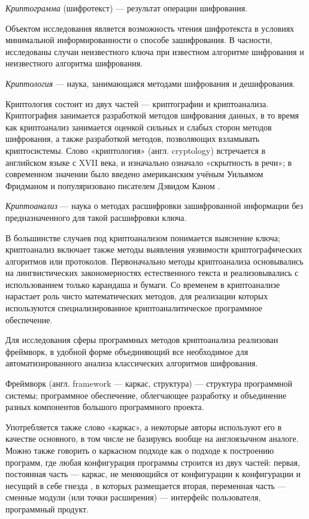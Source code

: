 \DEF\textit{Криптограмма} (шифротекст) --- результат операции шифрования.

Объектом исследования является возможность чтения шифротекста
в условиях минимальной информированности о способе 
зашифрования. В часности, исследованы случаи неизвестного 
ключа при известном алгоритме шифрования и неизвестного 
алгоритма шифрования.

\DEF\textit{Криптология} --- наука, занимающаяся методами шифрования и 
дешифрования. 

Криптология состоит из двух частей --- криптографии и криптоанализа. 
Криптография 
занимается разработкой методов шифрования данных, в то время как 
криптоанализ занимается оценкой сильных и слабых сторон методов 
шифрования, а также разработкой методов, позволяющих взламывать 
криптосистемы. Слово «криптология» (англ. cryptology) встречается в 
английском языке с XVII века, и изначально означало «скрытность в речи»; 
в современном значении было введено американским учёным Уильямом Фридманом 
и популяризовано писателем Дэвидом Каном \cite{khan-codebreakers}.

\DEF\textit{Криптоанализ} --- 
наука о методах расшифровки зашифрованной информации без предназначенного 
для такой расшифровки ключа.

В большинстве случаев под криптоанализом понимается выяснение ключа; 
криптоанализ включает также методы выявления уязвимости криптографических 
алгоритмов или протоколов. Первоначально методы криптоанализа основывались 
на лингвистических закономерностях естественного текста и реализовывались 
с использованием только карандаша и бумаги. Со временем в криптоанализе 
нарастает роль чисто математических методов, для реализации которых 
используются специализированное криптоаналитическое программное 
обеспечение.

Для исследования сферы программных методов криптоанализа 
реализован фреймворк, в удобной форме объединяющий все 
необходимое для автоматизированного анализа классических 
алгоритмов шифрования.

Фреймворк (англ. framework — каркас, структура) — структура программной 
системы; программное обеспечение, облегчающее разработку и объединение 
разных компонентов большого программного проекта. 

Употребляется 
также слово «каркас», а некоторые авторы используют его в качестве 
основного, в том числе не базируясь вообще на англоязычном аналоге.
Можно также говорить о каркасном подходе как о 
подходе к построению программ, где любая конфигурация программы 
строится из двух частей: первая, постоянная часть — каркас, не 
меняющийся от конфигурации к конфигурации и несущий в себе гнезда
, в которых размещается вторая, переменная часть — сменные модули 
(или точки расширения) --- интерфейс пользователя, программный 
продукт.


